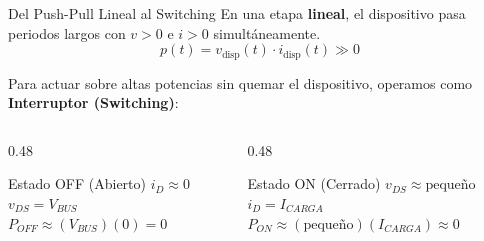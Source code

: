 \documentclass[aspectratio=169, table]{beamer}
\begin{document}
\begin{frame}{Del Push-Pull Lineal al Switching}
    En una etapa \textbf{lineal}, el dispositivo pasa periodos largos con $v > 0$ e $i > 0$ simultáneamente.
    \begin{equation*}
        p(t) = v_{\text{disp}}(t) \cdot i_{\text{disp}}(t) \gg 0
    \end{equation*}
    
    Para actuar sobre altas potencias sin quemar el dispositivo, operamos como \textbf{Interruptor (Switching)}:
    \begin{columns}
        \begin{column}{0.48\textwidth}
            \begin{block}{Estado OFF (Abierto)}
                $i_D \approx 0$ \\
                $v_{DS} = V_{BUS}$ \\
                $P_{OFF} \approx (V_{BUS})(0) = 0$
            \end{block}
        \end{column}
        \begin{column}{0.48\textwidth}
            \begin{block}{Estado ON (Cerrado)}
                $v_{DS} \approx \text{pequeño}$ \\
                $i_D = I_{CARGA}$ \\
                $P_{ON} \approx (\text{pequeño})(I_{CARGA}) \approx 0$
            \end{block}
        \end{column}
    \end{columns}
\end{frame}
\end{document}
